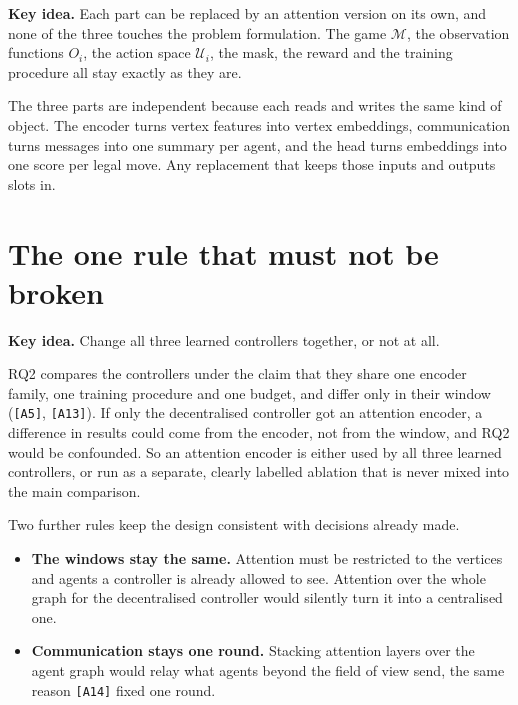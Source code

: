 \documentclass[11pt,a4paper]{article}
\newcommand{\idea}[1]{\par\smallskip\noindent\colorbox{boxbg}{\parbox{\dimexpr\linewidth-2\fboxsep}{\textbf{Key idea.} #1}}\par\smallskip}
\begin{document}
\idea{Each part can be replaced by an attention version on its own, and
none of the three touches the problem formulation. The game $\mathcal{M}$,
the observation functions $O_i$, the action space $\mathcal{U}_i$, the
mask, the reward and the training procedure all stay exactly as they are.}

\noindent The three parts are independent because each reads and writes
the same kind of object. The encoder turns vertex features into vertex
embeddings, communication turns messages into one summary per agent, and
the head turns embeddings into one score per legal move. Any replacement
that keeps those inputs and outputs slots in.

\section{The one rule that must not be broken}

\idea{Change all three learned controllers together, or not at all.}

RQ2 compares the controllers under the claim that they share one encoder
family, one training procedure and one budget, and differ only in their
window (\texttt{[A5]}, \texttt{[A13]}). If only the decentralised
controller got an attention encoder, a difference in results could come
from the encoder, not from the window, and RQ2 would be confounded. So an
attention encoder is either used by all three learned controllers, or run
as a separate, clearly labelled ablation that is never mixed into the main
comparison.

Two further rules keep the design consistent with decisions already made.

\begin{itemize}[leftmargin=*]
  \item \textbf{The windows stay the same.} Attention must be restricted to
        the vertices and agents a controller is already allowed to see.
        Attention over the whole graph for the decentralised controller
        would silently turn it into a centralised one.
  \item \textbf{Communication stays one round.} Stacking attention layers
        over the agent graph would relay what agents beyond the field of
        view send, the same reason \texttt{[A14]} fixed one round.
\end{itemize}

\end{document}

